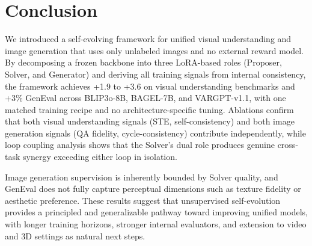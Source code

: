 \section{Conclusion}
\label{sec:conclusion}

We introduced a self-evolving framework for unified visual understanding and image generation that uses only unlabeled images and no external reward model. By decomposing a frozen backbone into three LoRA-based roles (Proposer, Solver, and Generator) and deriving all training signals from internal consistency, the framework achieves +1.9 to +3.6 on visual understanding benchmarks and +3\% GenEval across BLIP3o-8B, BAGEL-7B, and VARGPT-v1.1, with one matched training recipe and no architecture-specific tuning. Ablations confirm that both visual understanding signals (STE, self-consistency) and both image generation signals (QA fidelity, cycle-consistency) contribute independently, while loop coupling analysis shows that the Solver's dual role produces genuine cross-task synergy exceeding either loop in isolation.

Image generation supervision is inherently bounded by Solver quality, and GenEval does not fully capture perceptual dimensions such as texture fidelity or aesthetic preference. These results suggest that unsupervised self-evolution provides a principled and generalizable pathway toward improving unified models, with longer training horizons, stronger internal evaluators, and extension to video and 3D settings as natural next steps.

%
%

